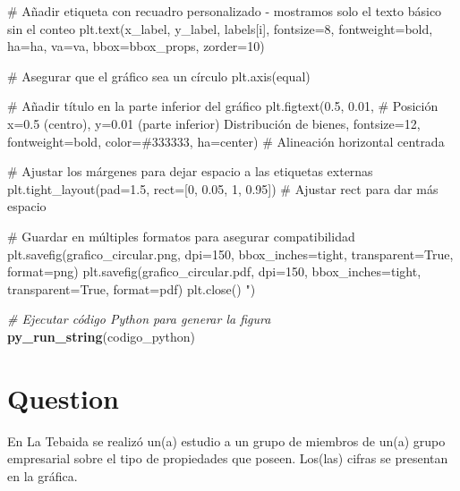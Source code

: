 \documentclass[
]{article}
\newenvironment{Shaded}{\begin{snugshade}}{\end{snugshade}}
\newcommand{\CommentTok}[1]{\textcolor[rgb]{0.56,0.35,0.01}{\textit{#1}}}
\newcommand{\FunctionTok}[1]{\textcolor[rgb]{0.13,0.29,0.53}{\textbf{#1}}}
\newcommand{\NormalTok}[1]{#1}
\newcommand{\StringTok}[1]{\textcolor[rgb]{0.31,0.60,0.02}{#1}}
\begin{document}
\begin{Shaded}
\begin{Highlighting}[]
\StringTok{    \# Añadir etiqueta con recuadro personalizado {-} mostramos solo el texto básico sin el conteo}
\StringTok{    plt.text(x\_label, y\_label, labels[i],}
\StringTok{            fontsize=8,}
\StringTok{            fontweight=\textquotesingle{}bold\textquotesingle{},}
\StringTok{            ha=ha,}
\StringTok{            va=va,}
\StringTok{            bbox=bbox\_props,}
\StringTok{            zorder=10)}

\StringTok{\# Asegurar que el gráfico sea un círculo}
\StringTok{plt.axis(\textquotesingle{}equal\textquotesingle{})}

\StringTok{\# Añadir título en la parte inferior del gráfico}
\StringTok{plt.figtext(0.5, 0.01,  \# Posición x=0.5 (centro), y=0.01 (parte inferior)}
\StringTok{           \textquotesingle{}Distribución de bienes\textquotesingle{},}
\StringTok{           fontsize=12,}
\StringTok{           fontweight=\textquotesingle{}bold\textquotesingle{},}
\StringTok{           color=\textquotesingle{}\#333333\textquotesingle{},}
\StringTok{           ha=\textquotesingle{}center\textquotesingle{})  \# Alineación horizontal centrada}

\StringTok{\# Ajustar los márgenes para dejar espacio a las etiquetas externas}
\StringTok{plt.tight\_layout(pad=1.5, rect=[0, 0.05, 1, 0.95])  \# Ajustar rect para dar más espacio}

\StringTok{\# Guardar en múltiples formatos para asegurar compatibilidad}
\StringTok{plt.savefig(\textquotesingle{}grafico\_circular.png\textquotesingle{}, dpi=150, bbox\_inches=\textquotesingle{}tight\textquotesingle{},}
\StringTok{           transparent=True, format=\textquotesingle{}png\textquotesingle{})}
\StringTok{plt.savefig(\textquotesingle{}grafico\_circular.pdf\textquotesingle{}, dpi=150, bbox\_inches=\textquotesingle{}tight\textquotesingle{},}
\StringTok{           transparent=True, format=\textquotesingle{}pdf\textquotesingle{})}
\StringTok{plt.close()}
\StringTok{"}\NormalTok{)}

\CommentTok{\# Ejecutar código Python para generar la figura}
\FunctionTok{py\_run\_string}\NormalTok{(codigo\_python)}
\end{Highlighting}
\end{Shaded}

\section{Question}\label{question}

En La Tebaida se realizó un(a) estudio a un grupo de miembros de un(a)
grupo empresarial sobre el tipo de propiedades que poseen. Los(las)
cifras se presentan en la gráfica.
\end{document}
